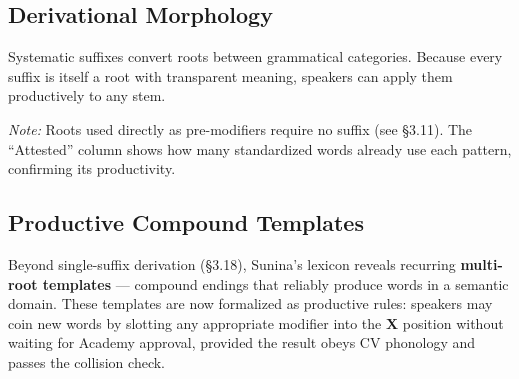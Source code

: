 \documentclass[12pt, a4paper]{article}
\begin{document}
\subsection{Derivational Morphology}
Systematic suffixes convert roots between grammatical categories. Because every suffix is itself a root with transparent meaning, speakers can apply them productively to any stem.

\vspace{0.5em}
\noindent{}

\vspace{0.5em}
\noindent\textit{Note:} Roots used directly as pre-modifiers require no suffix (see \S3.11). The ``Attested'' column shows how many standardized words already use each pattern, confirming its productivity.

\subsection{Productive Compound Templates}
Beyond single-suffix derivation (\S3.18), Sunina's lexicon reveals recurring \textbf{multi-root templates} --- compound endings that reliably produce words in a semantic domain. These templates are now formalized as productive rules: speakers may coin new words by slotting any appropriate modifier into the \textbf{X} position without waiting for Academy approval, provided the result obeys CV phonology and passes the collision check.
\end{document}
